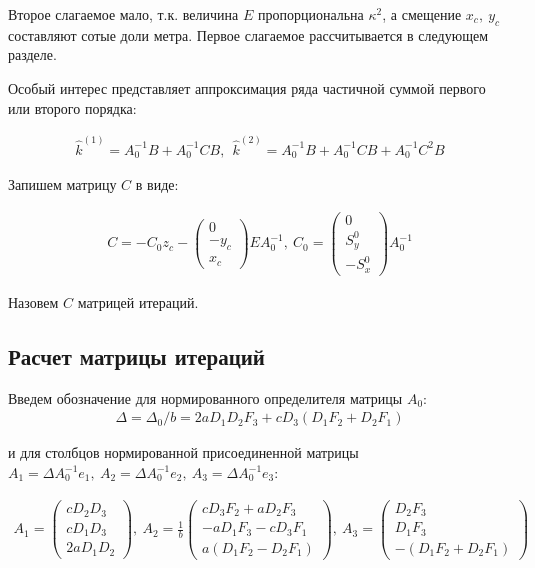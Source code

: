 Второе слагаемое мало, т.к. величина $E$ пропорциональна $\kappa^2$, а смещение $x_c,~y_c$ составляют сотые доли метра. Первое слагаемое рассчитывается в следующем разделе.

Особый интерес представляет аппроксимация ряда частичной суммой первого или второго порядка:

\begin{equation}
\begin{aligned}
	\hat{k}^{(1)} = A_0^{-1}B + A_0^{-1}CB, ~~ \hat{k}^{(2)} = A_0^{-1}B + A_0^{-1}CB  + A_0^{-1}C^2B
\end{aligned}
\end{equation}

Запишем матрицу $C$ в виде:

\begin{equation}
\begin{aligned}
	C = -C_0z_c - \begin{pmatrix}0 \\ -y_c \\ x_c \end{pmatrix}EA_0^{-1}, ~C_0 = \begin{pmatrix}0 \\ S_y^0 \\ -S_x^0 \end{pmatrix}A_0^{-1}
\end{aligned}
\end{equation}

Назовем $C$ матрицей итераций.

\subsection{Расчет матрицы итераций}

Введем обозначение для нормированного определителя матрицы $A_0$:
\begin{equation}
\begin{aligned}
	\Delta = \Delta_0/b = 2aD_1D_2F_3 + cD_3\left(D_1F_2 + D_2F_1\right)
\end{aligned}
\end{equation}

и для столбцов нормированной присоединенной матрицы $A_1 = \Delta A_0^{-1}e_1,~A_2 = \Delta A_0^{-1}e_2,~A_3 = \Delta A_0^{-1}e_3$:

\begin{equation}
\begin{aligned}
	A_1 = \begin{pmatrix}cD_2D_3 \\ cD_1D_3 \\ 2aD_1D_2\end{pmatrix},~ A_2 = \frac{1}{b}\begin{pmatrix}cD_3F_2 + aD_2F_3 \\ -aD_1F_3-cD_3F_1 \\ a\left(D_1F_2-D_2F_1\right)\end{pmatrix}, ~A_3=\begin{pmatrix}D_2F_3 \\ D_1F_3 \\ -\left(D_1F_2 + D_2F_1\right) \end{pmatrix}
\end{aligned}
\end{equation}

